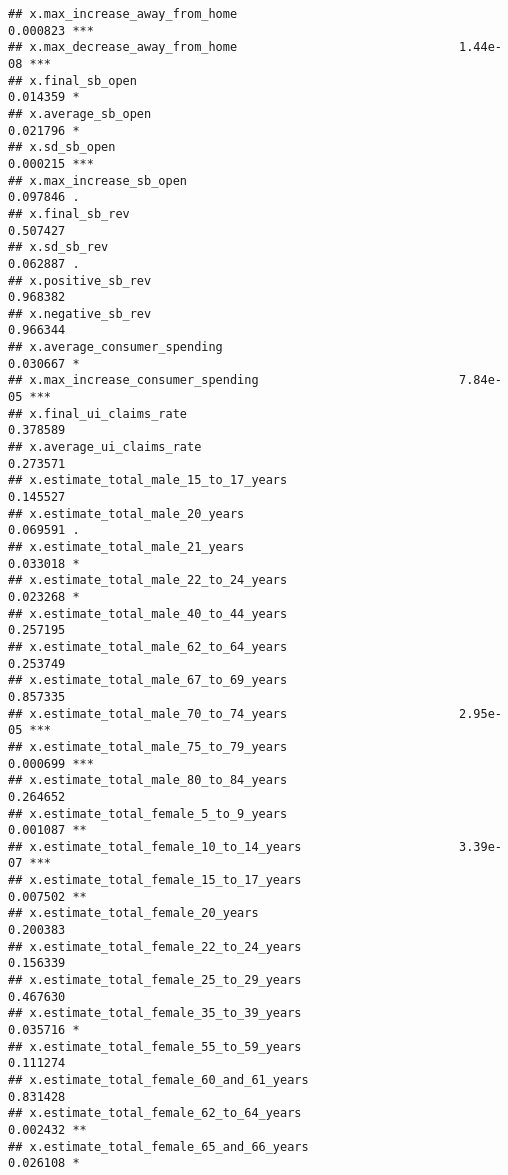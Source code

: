 \documentclass[
]{article}
\begin{document}
\begin{verbatim}
## x.max_increase_away_from_home                               0.000823 ***
## x.max_decrease_away_from_home                               1.44e-08 ***
## x.final_sb_open                                             0.014359 *  
## x.average_sb_open                                           0.021796 *  
## x.sd_sb_open                                                0.000215 ***
## x.max_increase_sb_open                                      0.097846 .  
## x.final_sb_rev                                              0.507427    
## x.sd_sb_rev                                                 0.062887 .  
## x.positive_sb_rev                                           0.968382    
## x.negative_sb_rev                                           0.966344    
## x.average_consumer_spending                                 0.030667 *  
## x.max_increase_consumer_spending                            7.84e-05 ***
## x.final_ui_claims_rate                                      0.378589    
## x.average_ui_claims_rate                                    0.273571    
## x.estimate_total_male_15_to_17_years                        0.145527    
## x.estimate_total_male_20_years                              0.069591 .  
## x.estimate_total_male_21_years                              0.033018 *  
## x.estimate_total_male_22_to_24_years                        0.023268 *  
## x.estimate_total_male_40_to_44_years                        0.257195    
## x.estimate_total_male_62_to_64_years                        0.253749    
## x.estimate_total_male_67_to_69_years                        0.857335    
## x.estimate_total_male_70_to_74_years                        2.95e-05 ***
## x.estimate_total_male_75_to_79_years                        0.000699 ***
## x.estimate_total_male_80_to_84_years                        0.264652    
## x.estimate_total_female_5_to_9_years                        0.001087 ** 
## x.estimate_total_female_10_to_14_years                      3.39e-07 ***
## x.estimate_total_female_15_to_17_years                      0.007502 ** 
## x.estimate_total_female_20_years                            0.200383    
## x.estimate_total_female_22_to_24_years                      0.156339    
## x.estimate_total_female_25_to_29_years                      0.467630    
## x.estimate_total_female_35_to_39_years                      0.035716 *  
## x.estimate_total_female_55_to_59_years                      0.111274    
## x.estimate_total_female_60_and_61_years                     0.831428    
## x.estimate_total_female_62_to_64_years                      0.002432 ** 
## x.estimate_total_female_65_and_66_years                     0.026108 *  

\end{verbatim}
\end{document}
